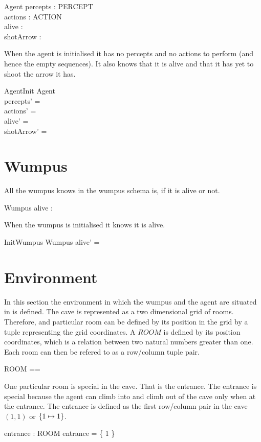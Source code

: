 \documentclass[a4paper]{article}
\begin{document}
\begin{schema}{Agent}
	percepts : \seq PERCEPT \\
	actions : \seq ACTION \\
	alive : \bool \\
	shotArrow : \bool
\end{schema}

When the agent is initialised it has no percepts and no actions to
perform (and hence the empty sequences). It also knows that it is alive
and that it has yet to shoot the arrow it has.
\begin{schema}{AgentInit}
	\Delta Agent \\
\where
	percepts' = \emptyseq \\
	actions' = \emptyseq \\
	alive' = \true \\
	shotArrow' = \false
\end{schema}

\section{Wumpus}
All the wumpus knows in the wumpus schema is, if it is alive or not.

\begin{schema}{Wumpus}
	alive : \bool
\end{schema}

When the wumpus is initialised it knows it is alive.

\begin{schema}{InitWumpus}
	\Delta Wumpus
\where
	alive' = \true
\end{schema}

\section{Environment}
In this section the environment in which the wumpus and the agent are
situated in is defined. The cave is represented as a two dimensional
grid of rooms. Therefore, and particular room can be defined by its
position in the grid by a tuple representing the grid coordinates.
A $ROOM$ is defined by its position coordinates, which is a relation
between two natural numbers greater than one. Each room can then be
refered to as a row/column tuple pair.
\begin{zed}
	ROOM == \natone \rel \natone
\end{zed}

One particular room is special in the cave. That is the entrance. The
entrance is special because the agent can climb into and climb out of
the cave only when at the entrance. The entrance is defined as the first
row/column pair in the cave $(1,1)$ or $\{1\mapsto1\}$.
\begin{axdef}
	entrance : ROOM
\ST
	entrance = \{ 1  \}
\end{axdef}
\end{document}
